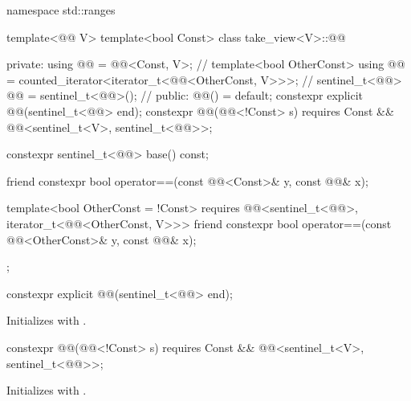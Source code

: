 %
\begin{codeblock}
namespace std::ranges {
  template<@@ V>
  template<bool Const>
  class take_view<V>::@@ {
  private:
    using @@ = @@<Const, V>;                                     // \expos
    template<bool OtherConst>
      using @@ = counted_iterator<iterator_t<@@<OtherConst, V>>>;  // \expos
    sentinel_t<@@> @@ = sentinel_t<@@>();                             // \expos
  public:
    @@() = default;
    constexpr explicit @@(sentinel_t<@@> end);
    constexpr @@(@@<!Const> s)
      requires Const && @@<sentinel_t<V>, sentinel_t<@@>>;

    constexpr sentinel_t<@@> base() const;

    friend constexpr bool operator==(const @@<Const>& y, const @@& x);

    template<bool OtherConst = !Const>
      requires @@<sentinel_t<@@>, iterator_t<@@<OtherConst, V>>>
    friend constexpr bool operator==(const @@<OtherConst>& y, const @@& x);
  };
}
\end{codeblock}

%
\begin{itemdecl}
constexpr explicit @@(sentinel_t<@@> end);
\end{itemdecl}

\begin{itemdescr}
\pnum
\effects
Initializes  with .
\end{itemdescr}

%
\begin{itemdecl}
constexpr @@(@@<!Const> s)
  requires Const && @@<sentinel_t<V>, sentinel_t<@@>>;
\end{itemdecl}

\begin{itemdescr}
\pnum
\effects
Initializes  with .
\end{itemdescr}


